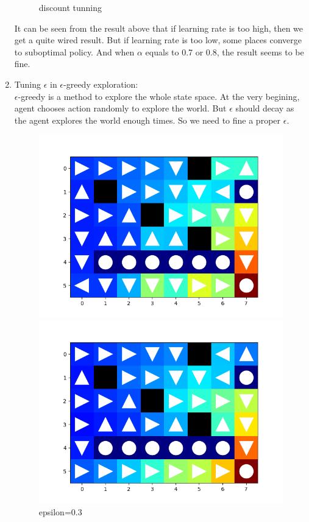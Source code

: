 \documentclass[aps,letterpaper,10pt]{revtex4}
\begin{document}
\begin{enumerate}
\begin{figure}[htbp]
            \centering 
            \caption{discount tunning} 
        \end{figure}
        \par
        It can be seen from the result above that if learning rate is too high, then we get 
        a quite wired result. But if learning rate is too low, some places converge to suboptimal policy. 
        And when $\alpha$ equals to 0.7 or 0.8, the result seems to be fine. 
        \newpage
        \item Tuning $\epsilon$ in $\epsilon$-greedy exploration:\\
        $\epsilon$-greedy is a method to explore the whole state space. At the very begining, agent 
        chooses action randomly to explore the world. But $\epsilon$ should decay as the agent explores 
        the world enough times. So we need to fine a proper $\epsilon$. 
        \begin{figure}[htbp] 
            \centering 
            \begin{minipage}[t]{0.5\linewidth}
            \centering 
            \includegraphics[scale=0.5]{e=3.png} 
            \caption{epsilon=0.3} 
            \end{minipage}%
            \begin{minipage}[t]{0.5\linewidth} 
            \centering 
            \includegraphics[scale=0.5]{ql_e_greedy.png} 

\end{minipage}
\end{figure}
\end{enumerate}
\end{document}
